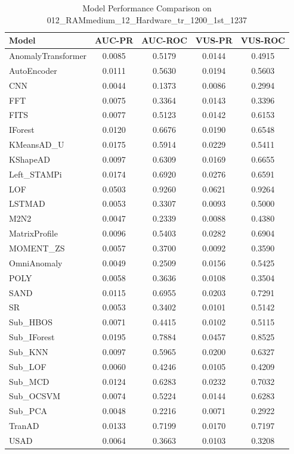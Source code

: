 \documentclass[12pt,oneside]{article}
\begin{document}
\begin{table}[H]
    \centering
    \caption{Model Performance Comparison on 012\_RAMmedium\_12\_Hardware\_tr\_1200\_1st\_1237}
    \begin{tabular}{|l|c|c|c|c|}
        \toprule
        \textbf{Model} & \textbf{AUC-PR} & \textbf{AUC-ROC} & \textbf{VUS-PR} & \textbf{VUS-ROC} \\
        \midrule
        AnomalyTransformer & 0.0085 & 0.5179 & 0.0144 & 0.4915 \\
        AutoEncoder & 0.0111 & 0.5630 & 0.0194 & 0.5603 \\
        CNN & 0.0044 & 0.1373 & 0.0086 & 0.2994 \\
        FFT & 0.0075 & 0.3364 & 0.0143 & 0.3396 \\
        FITS & 0.0077 & 0.5123 & 0.0142 & 0.6153 \\
        IForest & 0.0120 & 0.6676 & 0.0190 & 0.6548 \\
        KMeansAD\_U & 0.0175 & 0.5914 & 0.0229 & 0.5411 \\
        KShapeAD & 0.0097 & 0.6309 & 0.0169 & 0.6655 \\
        Left\_STAMPi & 0.0174 & 0.6920 & 0.0276 & 0.6591 \\
        LOF & 0.0503 & 0.9260 & 0.0621 & 0.9264 \\
        LSTMAD & 0.0053 & 0.3307 & 0.0093 & 0.5000 \\
        M2N2 & 0.0047 & 0.2339 & 0.0088 & 0.4380 \\
        MatrixProfile & 0.0096 & 0.5403 & 0.0282 & 0.6904 \\
        MOMENT\_ZS & 0.0057 & 0.3700 & 0.0092 & 0.3590 \\
        OmniAnomaly & 0.0049 & 0.2509 & 0.0156 & 0.5425 \\
        POLY & 0.0058 & 0.3636 & 0.0108 & 0.3504 \\
        SAND & 0.0115 & 0.6955 & 0.0203 & 0.7291 \\
        SR & 0.0053 & 0.3402 & 0.0101 & 0.5142 \\
        Sub\_HBOS & 0.0071 & 0.4415 & 0.0102 & 0.5115 \\
        Sub\_IForest & 0.0195 & 0.7884 & 0.0457 & 0.8525 \\
        Sub\_KNN & 0.0097 & 0.5965 & 0.0200 & 0.6327 \\
        Sub\_LOF & 0.0060 & 0.4246 & 0.0105 & 0.4209 \\
        Sub\_MCD & 0.0124 & 0.6283 & 0.0232 & 0.7032 \\
        Sub\_OCSVM & 0.0074 & 0.5224 & 0.0144 & 0.6283 \\
        Sub\_PCA & 0.0048 & 0.2216 & 0.0071 & 0.2922 \\
        TranAD & 0.0133 & 0.7199 & 0.0170 & 0.7197 \\
        USAD & 0.0064 & 0.3663 & 0.0103 & 0.3208 \\
        \bottomrule
    \end{tabular}
    
    \label{tab:model_performance_RAMmedium}
\end{table}
\end{document}
